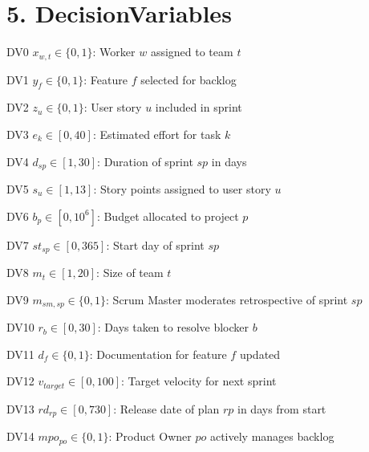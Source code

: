 \documentclass[12pt]{article}
\begin{document}
\section{5. DecisionVariables}
\item[DV0] $x_{w,t} \in \{0,1\}$: Worker $w$ assigned to team $t$
    \item[DV1] $y_f \in \{0,1\}$: Feature $f$ selected for backlog
    \item[DV2] $z_u \in \{0,1\}$: User story $u$ included in sprint
    \item[DV3] $e_k \in [0, 40]$: Estimated effort for task $k$
    \item[DV4] $d_{sp} \in [1, 30]$: Duration of sprint $sp$ in days
    \item[DV5] $s_u \in [1, 13]$: Story points assigned to user story $u$
    \item[DV6] $b_p \in [0, 10^6]$: Budget allocated to project $p$
    \item[DV7] $st_{sp} \in [0, 365]$: Start day of sprint $sp$
    \item[DV8] $m_t \in [1, 20]$: Size of team $t$
    \item[DV9] $m_{sm,sp} \in \{0,1\}$: Scrum Master moderates retrospective of sprint $sp$
    \item[DV10] $r_b \in [0, 30]$: Days taken to resolve blocker $b$
    \item[DV11] $d_f \in \{0,1\}$: Documentation for feature $f$ updated
    \item[DV12] $v_{target} \in [0, 100]$: Target velocity for next sprint
    \item[DV13] $rd_{rp} \in [0, 730]$: Release date of plan $rp$ in days from start
    \item[DV14] $mpo_{po} \in \{0,1\}$: Product Owner $po$ actively manages backlog
\end{document}
